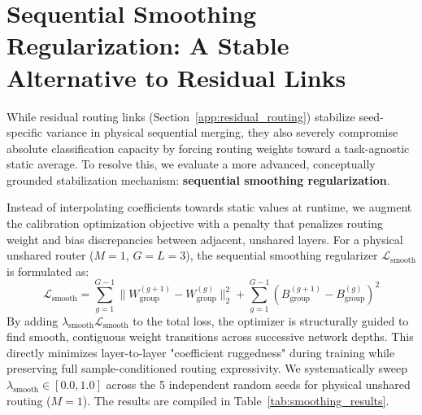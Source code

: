 \section{Sequential Smoothing Regularization: A Stable Alternative to Residual Links}
\label{app:sequential_smoothing}
While residual routing links (Section~\ref{app:residual_routing}) stabilize seed-specific variance in physical sequential merging, they also severely compromise absolute classification capacity by forcing routing weights toward a task-agnostic static average. To resolve this, we evaluate a more advanced, conceptually grounded stabilization mechanism: \textbf{sequential smoothing regularization}. 

Instead of interpolating coefficients towards static values at runtime, we augment the calibration optimization objective with a penalty that penalizes routing weight and bias discrepancies between adjacent, unshared layers. For a physical unshared router ($M=1$, $G = L = 3$), the sequential smoothing regularizer $\mathcal{L}_{\text{smooth}}$ is formulated as:
\begin{equation}
\mathcal{L}_{\text{smooth}} = \sum_{g=1}^{G-1} \|W_{\text{group}}^{(g+1)} - W_{\text{group}}^{(g)}\|_2^2 + \sum_{g=1}^{G-1} (B_{\text{group}}^{(g+1)} - B_{\text{group}}^{(g)})^2
\end{equation}
By adding $\lambda_{\text{smooth}} \mathcal{L}_{\text{smooth}}$ to the total loss, the optimizer is structurally guided to find smooth, contiguous weight transitions across successive network depths. This directly minimizes layer-to-layer "coefficient ruggedness" during training while preserving full sample-conditioned routing expressivity. We systematically sweep $\lambda_{\text{smooth}} \in [0.0, 1.0]$ across the 5 independent random seeds for physical unshared routing ($M=1$). The results are compiled in Table~\ref{tab:smoothing_results}.

